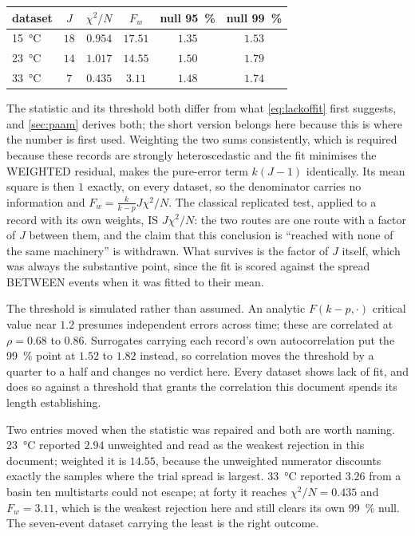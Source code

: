 \documentclass[10pt]{article}
\begin{document}
\begin{center}
\begin{tabular}{lccccc}
\toprule
dataset & $J$ & $\chi^2/N$ & $F_w$ & null \SI{95}{\percent} & null \SI{99}{\percent} \\
\midrule
\SI{15}{\celsius} & $18$ & $0.954$ & $\mathbf{17.51}$ & $1.35$ & $1.53$ \\
\SI{23}{\celsius} & $14$ & $1.017$ & $\mathbf{14.55}$ & $1.50$ & $1.79$ \\
\SI{33}{\celsius} & $7$ & $0.435$ & $\mathbf{3.11}$ & $1.48$ & $1.74$ \\
\bottomrule
\end{tabular}
\end{center}

\noindent The statistic and its threshold both differ from what \eqref{eq:lackoffit} first
suggests, and \cref{sec:paam} derives both; the short version belongs here because this is where
the number is first used. Weighting the two sums consistently, which is required because these
records are strongly heteroscedastic and the fit minimises the WEIGHTED residual, makes the
pure-error term $k(J-1)$ identically. Its mean square is then $1$ exactly, on every dataset, so
the denominator carries no information and $F_w = \tfrac{k}{k-p}J\chi^2/N$. The classical
replicated test, applied to a record with its own weights, IS $J\chi^2/N$: the two routes are one
route with a factor of $J$ between them, and the claim that this conclusion is ``reached with
none of the same machinery'' is withdrawn. What survives is the factor of $J$ itself, which was
always the substantive point, since the fit is scored against the spread BETWEEN events when it
was fitted to their mean.

The threshold is simulated rather than assumed. An analytic $F(k-p,\cdot)$ critical value near
$1.2$ presumes independent errors across time; these are correlated at $\rho = 0.68$ to $0.86$.
Surrogates carrying each record's own autocorrelation put the \SI{99}{\percent} point at $1.52$
to $1.82$ instead, so correlation moves the threshold by a quarter to a half and changes no
verdict here. Every dataset shows lack of fit, and does so against a threshold that grants the
correlation this document spends its length establishing.

Two entries moved when the statistic was repaired and both are worth naming. \SI{23}{\celsius}
reported $2.94$ unweighted and read as the weakest rejection in this document; weighted it is
$14.55$, because the unweighted numerator discounts exactly the samples where the trial spread is
largest. \SI{33}{\celsius} reported $3.26$ from a basin ten multistarts could not escape; at
forty it reaches $\chi^2/N = 0.435$ and $F_w = 3.11$, which is the weakest rejection here and
still clears its own \SI{99}{\percent} null. The seven-event dataset carrying the least is the
right outcome.
\end{document}
